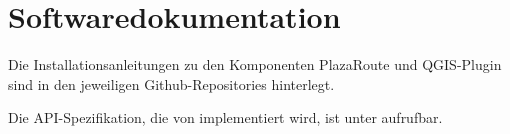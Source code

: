 \section{Softwaredokumentation}
\label{sec:Softwaredokumentation}

Die Installationsanleitungen zu den Komponenten PlazaRoute und QGIS-Plugin sind in den jeweiligen Github-Repositories \cite{github:PlazaRoute} \cite{github:PlazaRoute-qgis-plugin} hinterlegt.

Die \ac{API}-Spezifikation, die von  implementiert wird, ist unter \cite{plaza-routing-api-spez} aufrufbar.